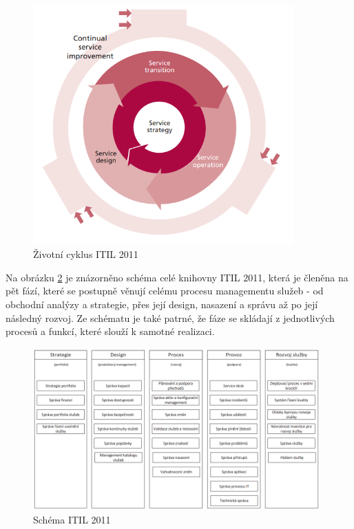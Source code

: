 \documentclass[
  digital,     %
  twoside,     %
  lof,         %
  lot,         %
]{fithesis4}
\begin{document}
\begin{figure}[h]
  \begin{center}
          \includegraphics[width=10cm]{img/itil_V3_proces.png}
  \end{center}
  \caption{Životní cyklus ITIL 2011 \parencite[s.~7]{Carlidge2007}}
  \label{fig:itil3_lifecycle}
\end{figure}  

Na obrázku \ref{fig:itil3_schema} je znázorněno schéma celé knihovny ITIL 2011, která je členěna na pět fází, které se postupně věnují celému procesu managementu služeb - od obchodní analýzy a strategie, přes její design, nasazení a správu až po její následný rozvoj. Ze schématu je také patrné, že fáze se skládají z jednotlivých procesů a funkcí, které slouží k samotné realizaci.

\begin{figure}[h]
  \begin{center}
          \includegraphics[width=11cm]{img/itil_V3_schema.png}
  \end{center}
  \caption{Schéma ITIL 2011 \parencite[s.~32]{Matula2017}}
  \label{fig:itil3_schema}
\end{figure} 
\end{document}
